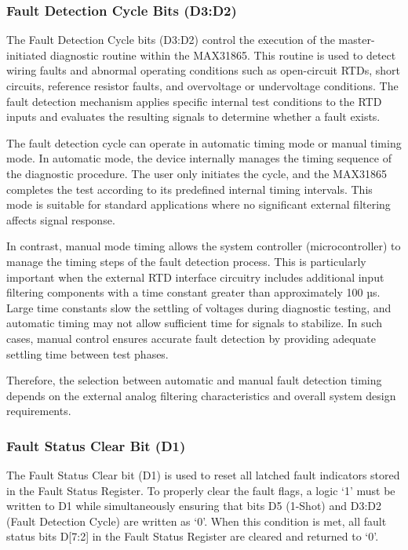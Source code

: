 \subsubsection{Fault Detection Cycle Bits (D3:D2)}
The Fault Detection Cycle bits (D3:D2) control the execution of the master-initiated diagnostic routine within the MAX31865. This routine is used to detect wiring faults and abnormal operating conditions such as open-circuit RTDs, short circuits, reference resistor faults, and overvoltage or undervoltage conditions. The fault detection mechanism applies specific internal test conditions to the RTD inputs and evaluates the resulting signals to determine whether a fault exists.

The fault detection cycle can operate in automatic timing mode or manual timing mode. In automatic mode, the device internally manages the timing sequence of the diagnostic procedure. The user only initiates the cycle, and the MAX31865 completes the test according to its predefined internal timing intervals. This mode is suitable for standard applications where no significant external filtering affects signal response.

In contrast, manual mode timing allows the system controller (microcontroller) to manage the timing steps of the fault detection process. This is particularly important when the external RTD interface circuitry includes additional input filtering components with a time constant greater than approximately 100 µs. Large time constants slow the settling of voltages during diagnostic testing, and automatic timing may not allow sufficient time for signals to stabilize. In such cases, manual control ensures accurate fault detection by providing adequate settling time between test phases.

Therefore, the selection between automatic and manual fault detection timing depends on the external analog filtering characteristics and overall system design requirements.

\subsubsection{Fault Status Clear Bit (D1)}
The Fault Status Clear bit (D1) is used to reset all latched fault indicators stored in the Fault Status Register. To properly clear the fault flags, a logic ‘1’ must be written to D1 while simultaneously ensuring that bits D5 (1-Shot) and D3:D2 (Fault Detection Cycle) are written as ‘0’. When this condition is met, all fault status bits D[7:2] in the Fault Status Register are cleared and returned to ‘0’.

